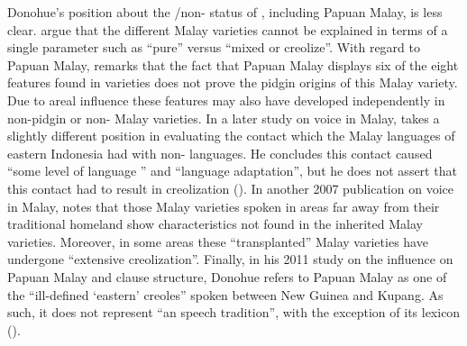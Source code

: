 {Donohue’s} position about the /non- status of , including Papuan Malay, is less clear. \citet[68]{Donohue.1998} argue that the different Malay varieties cannot be explained in terms of a single parameter such as  ``pure'' versus ``mixed or creolize''. With regard to Papuan Malay, \citet[1]{Donohue.2003} remarks that the fact that Papuan Malay displays six of the eight features found in {}  varieties does not prove the pidgin origins of this Malay variety. Due to areal influence these features may also have developed independently in non-pidgin or non- Malay varieties. In a later study on voice in Malay, \citet{Donohue.2007} takes a slightly different position in evaluating the contact which the Malay languages of eastern Indonesia had with non- languages. He concludes this contact caused  ``some level of language '' and  ``language adaptation'', but he does not assert that this contact had to result in creolization (\citeyear*[1496]{Donohue.2007}). In another 2007 publication on voice  in Malay, \citet[72]{Donohue.2007b} notes that those Malay varieties spoken in areas far away from their traditional homeland show characteristics not found in the inherited Malay varieties. Moreover, in some areas these  ``transplanted'' Malay varieties have undergone  ``extensive creolization''. Finally, in his 2011 study on the  influence on Papuan Malay  and clause structure, {Donohue} refers to Papuan Malay as one of the  ``ill-defined ‘eastern’ creoles'' spoken between New Guinea and Kupang. As such, it does not represent  ``an  speech tradition'', with the exception of its lexicon (\citeyear*[433]{Donohue.2011}).




